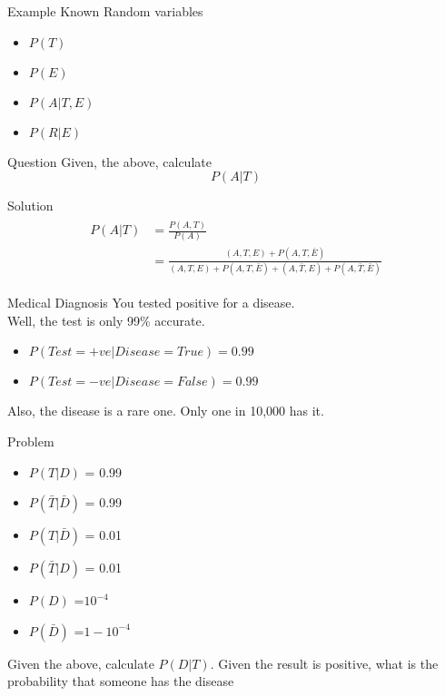 \documentclass{beamer}
\begin{document}
\begin{frame}{Example}
    Known Random variables
    \begin{itemize}
        \item $P(T)$
        \item $P(E)$
        \item $P(A|T,E)$
        \item $P(R|E)$
    \end{itemize}
\end{frame}


\begin{frame}{Question}
    Given, the above, calculate
    \begin{equation*}
        P(A|T)
    \end{equation*}
\end{frame}

\begin{frame}{Solution}
    \begin{align*}
        \begin{split}
            P(A|T) &= \frac{P(A,T)}{P(A)}\\
            &=\frac{(A,T,E)+P(A,T,\bar{E})}{(A,T,E)+P(A,T,\bar{E}) + (A,\bar{T},E)+P(A,\bar{T},\bar{E})}
        \end{split}
    \end{align*}
\end{frame}

\begin{frame}{Medical Diagnosis}
    You tested positive for a disease.\\
    Well, the test is only 99\% accurate.\\
    \begin{itemize}
        \item $P(Test = +ve | Disease = True) = 0.99$
        \item $P(Test = -ve | Disease = False) = 0.99$
    \end{itemize}
    Also, the disease is a rare one. Only one in 10,000 has it.
\end{frame}

\begin{frame}{Problem}
    \begin{itemize}
        \item $P(T|D)$ = 0.99
        \item $P(\bar{T}|\bar{D})$ = 0.99
        \item $P(T|\bar{D})$ = 0.01
        \item $P(\bar{T}|D)$ = 0.01
        \item $P(D)$ =$ 10^{-4}$
        \item $P(\bar{D})$ =$ 1 - 10^{-4}$
    \end{itemize}
    
    Given the above, calculate $P(D|T)$. Given the result is positive, what is the probability that someone has the disease
\end{frame}
\end{document}
